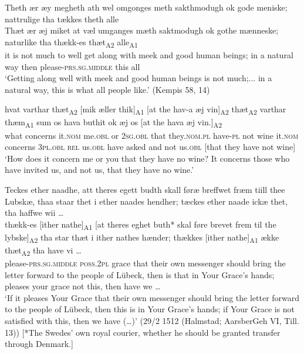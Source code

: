 \documentclass[output=paper]{langscibook}
\begin{document}
\begin{exe}
\ex  \label{ex:heltoft:47}
    \glll Theth ær æy megheth ath wel omgonges meth sakthmodugh ok gode meniske; nattrulige tha tækkes theth alle\\
    Thæt ær æj miket    at væl umganges mæth   saktmodugh   ok     gothe mænneske; naturlike tha  thækk-es        thæt\textsubscript{A2} alle\textsubscript{A1}\\
    it is not much      to well {get along} with    meek       and   good {human beings}; {in a natural way}  then please-\textsc{prs.sg.middle}   this    all\\
    \glt ‘Getting along well with meek and good human beings is not much;... in a natural way, this is what all people like.' (Kempis 58, 14)

  \ex  \label{ex:heltoft:48}
    \gll hvat varthar    thæt\textsubscript{A2}   [mik     æller  thik]\textsubscript{A1}   [at  the       hav-a æj vin]\textsubscript{A2} thæt\textsubscript{A2} varthar    thæm\textsubscript{A1}  sum os     hava  buthit ok æj    os [at the hava æj vin.]\textsubscript{A2}\\
    what concerns it.\textsc{nom}   me.\textsc{obl} or    \textsc{2sg.obl}  that they.\textsc{nom.pl} have-\textsc{pl}  not wine it.\textsc{nom} concerns  \textsc{3pl.obl}  \textsc{rel}  us.\textsc{obl}  have   asked and not   us.\textsc{obl} [that they have not wine]\\
    \glt ‘How does it concern me or you that they have no wine? It concerns those who have invited us, and not us, that they have no wine.'

\ex   \label{ex:heltoft:49}
    \glll  Teckes ether naadhe, att theres egett budth skall føræ breffwet fræm tiill thee Lubskæ, thaa staar thet i ether naades hendher; tæckes ether naade ickæ thet, tha haffwe wii …\\
    thækk-es   [ither nathe]\textsubscript{A1} [at theres eghet buth* skal føre brevet frem til the lybske]\textsubscript{A2} tha star thæt i ither nathes hænder; thækkes    [ither  nathe]\textsubscript{A1} ække    thæt\textsubscript{A2}   tha    have   vi …\\
    please-\textsc{prs.sg.middle}  \textsc{poss.2pl} grace that their own messenger should bring {the letter} forward to the {people of Lübeck}, then is that in Your Grace's hands; pleases     your grace     not     this,    then   have  we …\\
    \glt ‘If it pleases Your Grace that their own messenger should bring the letter forward to the people of Lübeck, then this is in Your Grace's hands; if Your Grace is not satisfied with this, then we have (…)' (29/2 1512 (Halmstad; AarsberGeh VI, Till. 13)) [*The Swedes' own royal courier, whether he should be granted transfer through Denmark.]\\
\end{exe}
\end{document}
